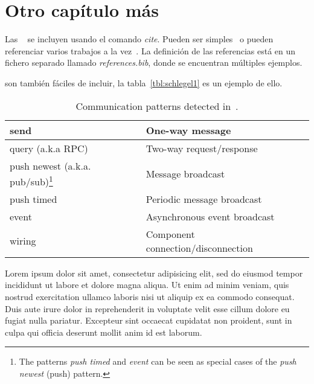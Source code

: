 \chapter{Otro capítulo más}

Las ~\cite{Smith-2006} se incluyen usando el comando \textit{cite}. Pueden ser simples~\cite{Smith-2006} o pueden referenciar varios trabajos a la vez~\cite{Smith-2006,Schlegel-2006}. La definición de las referencias está en un fichero separado llamado \textit{references.bib}, donde se encuentran múltiples ejemplos.

\par
{} son también fáciles de incluir, la tabla~\ref{tbl:schlegel1} es un ejemplo de ello. 
\begin{table}[thbp]
\centering
\caption{Communication patterns detected in~\cite{Schlegel-2006}.} 
\begin{centering}
 \begin{minipage}{0.9\textwidth}\label{tbl:schlegel1}
  \centering
  \begin{tabular}{|l|l|} 
   \hline
send & One-way message \\ \hline
query (a.k.a RPC) & Two-way request/response \\ \hline
push newest (a.k.a. pub/sub)\footnote{\label{note_patterns}The patterns \textit{push timed} and \textit{event} can be seen as special cases of the \textit{push newest} (push) pattern.} & Message broadcast \\ \hline
push timed & Periodic message broadcast \\ \hline
event & Asynchronous event broadcast \\ \hline
wiring & Component connection/disconnection \\ \hline
   \end{tabular} 
  \end{minipage}
 \end{centering} 
\end{table}
\par
\par
Lorem ipsum dolor sit amet, consectetur adipisicing elit, sed do eiusmod tempor incididunt ut labore et dolore magna aliqua. Ut enim ad minim veniam, quis nostrud exercitation ullamco laboris nisi ut aliquip ex ea commodo consequat. Duis aute irure dolor in reprehenderit in voluptate velit esse cillum dolore eu fugiat nulla pariatur. Excepteur sint occaecat cupidatat non proident, sunt in culpa qui officia deserunt mollit anim id est laborum.


